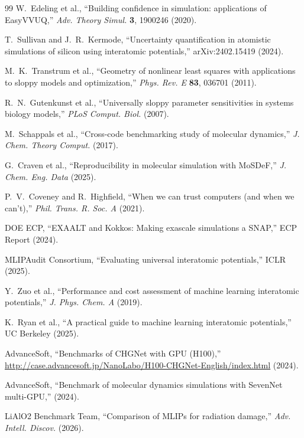 \documentclass[11pt,a4paper]{article}
\begin{document}
\begin{thebibliography}{99}
W.~Edeling et al., ``Building confidence in simulation: applications of EasyVVUQ,'' \textit{Adv. Theory Simul.} \textbf{3}, 1900246 (2020).

T.~Sullivan and J.~R.~Kermode, ``Uncertainty quantification in atomistic simulations of silicon using interatomic potentials,'' arXiv:2402.15419 (2024).

M.~K.~Transtrum et al., ``Geometry of nonlinear least squares with applications to sloppy models and optimization,'' \textit{Phys. Rev. E} \textbf{83}, 036701 (2011).

R.~N.~Gutenkunst et al., ``Universally sloppy parameter sensitivities in systems biology models,'' \textit{PLoS Comput. Biol.} (2007).

M.~Schappals et al., ``Cross-code benchmarking study of molecular dynamics,'' \textit{J. Chem. Theory Comput.} (2017).

G.~Craven et al., ``Reproducibility in molecular simulation with MoSDeF,'' \textit{J. Chem. Eng. Data} (2025).

P.~V.~Coveney and R.~Highfield, ``When we can trust computers (and when we can't),'' \textit{Phil. Trans. R. Soc. A} (2021).

DOE ECP, ``EXAALT and Kokkos: Making exascale simulations a SNAP,'' ECP Report (2024).

MLIPAudit Consortium, ``Evaluating universal interatomic potentials,'' ICLR (2025).

Y.~Zuo et al., ``Performance and cost assessment of machine learning interatomic potentials,'' \textit{J. Phys. Chem. A} (2019).

K.~Ryan et al., ``A practical guide to machine learning interatomic potentials,'' UC Berkeley (2025).

AdvanceSoft, ``Benchmarks of CHGNet with GPU (H100),'' \url{http://case.advancesoft.jp/NanoLabo/H100-CHGNet-English/index.html} (2024).

AdvanceSoft, ``Benchmark of molecular dynamics simulations with SevenNet multi-GPU,'' (2024).

LiAlO2 Benchmark Team, ``Comparison of MLIPs for radiation damage,'' \textit{Adv. Intell. Discov.} (2026).


\end{thebibliography}
\end{document}
